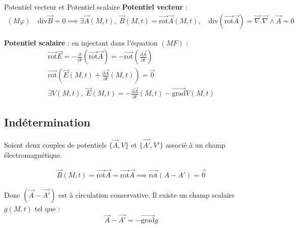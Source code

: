 \begin{Definition}[colbacktitle=red!75!black]{Potentiel vecteur et Potentiel scalaire}{}
  \textbf{Potentiel vecteur} : 
\begin{gather}
  (M\varphi) \quad \mathrm{div} \overrightarrow{B} = 0 \implies
  \exists \overrightarrow{A}(M,t), \;\boxed{\overrightarrow{B}(M,t) = \overrightarrow{\mathrm{rot}} \overrightarrow{A} (M,t)}, \quad \mathrm{div} ( \overrightarrow{\mathrm{rot}}\overrightarrow{A}) = \overrightarrow{\nabla}. \overrightarrow{\nabla } \wedge \overrightarrow{A}= 0  
\end{gather}

\textbf{Potentiel scalaire} : en injectant dans l'équation $(MF)$ :
  \begin{gather}
  \overrightarrow{\mathrm{rot}} \overrightarrow{E} = - \frac{\partial }{\partial t} ( \overrightarrow{\mathrm{rot}} \overrightarrow{A}) = - \overrightarrow{\mathrm{rot}}( \frac{\partial \overrightarrow{A}}{\partial t} ) \\ 
  \overrightarrow{\mathrm{rot}} \left( \overrightarrow{E}(M, t) + \frac{\partial \overrightarrow{A}}{\partial t} (M,t) \right) = \overrightarrow{0} \\ 
  \exists V(M,t), \;\boxed{\overrightarrow{E}(M,t) = - \frac{\partial \overrightarrow{A}}{\partial t} (M,t) - \overrightarrow{\mathrm{grad}} V(M,t)}
  \end{gather}
\end{Definition}

\subsection{Indétermination} %
\label{sec:Indétermination}

Soient deux couples de potentiels $\{\overrightarrow{A},V\}$ et $\{\overrightarrow{A'}, V'\}$ associé à un champ électromagnétique.

\begin{gather}
  \overrightarrow{B}(M,t) = \overrightarrow{\mathrm{rot}} \overrightarrow{A } = \overrightarrow{\mathrm{rot}}\overrightarrow{A} \implies \overrightarrow{\mathrm{rot}}(A - A') = \overrightarrow{0}
\end{gather}

Donc $(\overrightarrow{A} - \overrightarrow{A'})$ est à circulation conservative. Il existe un champ scalaire $g(M,t)$ tel que :
\begin{equation}
  \boxed{  \overrightarrow{A} - \overrightarrow{A'} = - \overrightarrow{\mathrm{grad}}g}
\end{equation}

